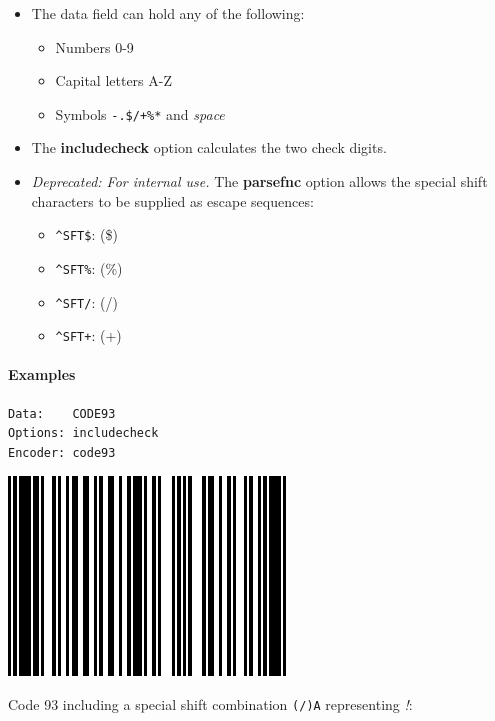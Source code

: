 \begin{itemize}
\tightlist
\item
  The data field can hold any of the following:

  \begin{itemize}
  \tightlist
  \item
    Numbers 0-9
  \item
    Capital letters A-Z
  \item
    Symbols \texttt{-.\$/+\%*} and \emph{space}
  \end{itemize}
\item
  The \textbf{includecheck} option calculates the two check digits.
\item
  \emph{Deprecated: For internal use.} The \textbf{parsefnc} option
  allows the special shift characters to be supplied as escape
  sequences:

  \begin{itemize}
  \tightlist
  \item
    \texttt{\^{}SFT\$}: (\$)
  \item
    \texttt{\^{}SFT\%}: (\%)
  \item
    \texttt{\^{}SFT/}: (/)
  \item
    \texttt{\^{}SFT+}: (+)
  \end{itemize}
\end{itemize}

\hypertarget{examples-17}{%
\paragraph{Examples}\label{examples-17}}

\begin{verbatim}
Data:    CODE93
Options: includecheck
Encoder: code93
\end{verbatim}

\includegraphics{images/code93-1.eps}

Code 93 including a special shift combination \texttt{(/)A} representing
\emph{!}:

